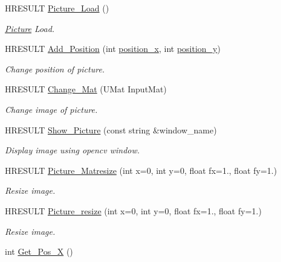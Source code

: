\begin{DoxyCompactItemize}
H\+R\+E\+S\+U\+LT \hyperlink{class_my_picture_1_1_picture_a5ebb2bcdb3fe7edefdc615d5601e2e61}{Picture\+\_\+\+Load} ()
\begin{DoxyCompactList}\small\item\em \hyperlink{class_my_picture_1_1_picture}{Picture} Load. \end{DoxyCompactList}\item 
H\+R\+E\+S\+U\+LT \hyperlink{class_my_picture_1_1_picture_af3433b1b7497ec2f873515cfc2ee2d80}{Add\+\_\+\+Position} (int \hyperlink{group___the_ga5f9040e5635fe0db42cfcf7f2f2219a6}{position\+\_\+x}, int \hyperlink{group___the_ga86b8259886daf41584d67aca98ef9b95}{position\+\_\+y})
\begin{DoxyCompactList}\small\item\em Change position of picture. \end{DoxyCompactList}\item 
H\+R\+E\+S\+U\+LT \hyperlink{class_my_picture_1_1_picture_a20ef0dd686bd8e5f57ad22aa04309b81}{Change\+\_\+\+Mat} (U\+Mat Input\+Mat)
\begin{DoxyCompactList}\small\item\em Change image of picture. \end{DoxyCompactList}\item 
H\+R\+E\+S\+U\+LT \hyperlink{class_my_picture_1_1_picture_ae42ccbc7f4f57e2b1c65d2f88ff66ac5}{Show\+\_\+\+Picture} (const string \&window\+\_\+name)
\begin{DoxyCompactList}\small\item\em Display image using opencv window. \end{DoxyCompactList}\item 
H\+R\+E\+S\+U\+LT \hyperlink{class_my_picture_1_1_picture_a495538457fc6b5219dcbd5668fb1e435}{Picture\+\_\+\+Matresize} (int x=0, int y=0, float fx=1., float fy=1.)
\begin{DoxyCompactList}\small\item\em Resize image. \end{DoxyCompactList}\item 
H\+R\+E\+S\+U\+LT \hyperlink{class_my_picture_1_1_picture_ada82efe422bb47a53513aeb1e7e9abb5}{Picture\+\_\+resize} (int x=0, int y=0, float fx=1., float fy=1.)
\begin{DoxyCompactList}\small\item\em Resize image. \end{DoxyCompactList}\item 
int \hyperlink{class_my_picture_1_1_picture_a8f5d91984f90aab3178a63ce6a4c78cb}{Get\+\_\+\+Pos\+\_\+X} ()

\end{DoxyCompactItemize}
